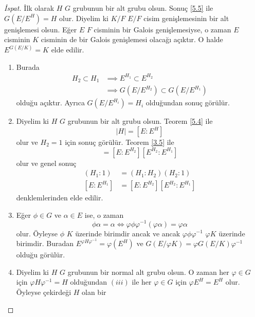 \documentclass{article}
\theoremstyle{definition}
\theoremstyle{remark}
\newcommand{\envert}[1]{\left\lvert#1\right\rvert}
\let\abs=\envert
\begin{document}
    	    \begin{proof}[İspat]
    	        İlk olarak $H$ $G$ grubunun bir alt grubu olsun. Sonuç \ref{5.5} ile $G(E/E^H) = H$ olur. Diyelim ki $K/F$ $E/F$ cisim genişlemesinin bir alt genişlemesi olsun. Eğer $E$ $F$ cisminin bir Galois genişlemesiyse, o zaman $E$ cisminin $K$ cisminin de bir Galois genişlemesi olacağı açıktır. O halde $E^{G(E/K)} = K$ elde edilir.
    	        \begin{enumerate}
    				\renewcommand{\labelenumi}{(\roman{enumi})}
    				\item Burada
    				\begin{align*}
    				    H_2 \subset H_1 &\implies E^{H_1} \subset E^{H_2}\\
    				    &\implies G(E/E^{H_2}) \subset G(E/E^{H_1})
    				\end{align*}
    				olduğu açıktır. Ayrıca $G(E/E^{H_i}) = H_i$ olduğundan sonuç görülür.
    				\item Diyelim ki $H$ $G$ grubunun bir alt grubu olsun. Teorem \ref{5.4} ile
    				\begin{equation*}
    				    \abs{H} = [E : E^H]
    				\end{equation*}
    			    olur ve $H_2 = 1$ için sonuç görülür. Teorem \ref{3.5} ile
    			    \begin{equation*}
    			        [E : E^{H_1}] = [E : E^{H_2}][E^{H_2} : E^{H_1}]
    			    \end{equation*}
    			    olur ve genel sonuç
    			    \begin{align*}
    			        (H_1 : 1) &= (H_1 : H_2)(H_2 : 1)\\
    			        [E : E^{H_1}] &= [E : E^{H_2}][E^{H_2} : E^{H_1}]
    			    \end{align*}
    			    denklemlerinden elde edilir.
    			    \item Eğer $\phi \in G$ ve $\alpha \in E$ ise, o zaman
    			    \begin{equation*}
    			        \phi \alpha = \alpha \iff \varphi \phi \varphi^{-1}(\varphi \alpha) = \varphi \alpha
    			    \end{equation*}
    			    olur. Öyleyse $\phi$ $K$ üzerinde birimdir ancak ve ancak $\varphi \phi \varphi^{-1}$ $\varphi K$ üzerinde birimdir. Buradan $E^{\varphi H \varphi^{-1}} = \varphi(E^H)$ ve $G(E/\varphi K) = \varphi G(E/K) \varphi^{-1}$ olduğu görülür.
    			    \item Diyelim ki $H$ $G$ grubunun bir normal alt grubu olsun. O zaman her $\varphi \in G$ için $\varphi H \varphi^{-1} = H$ olduğundan $(iii)$ ile her $\varphi \in G$ için $\varphi E^H = E^H$ olur. Öyleyse çekirdeği $H$ olan bir

\end{enumerate}
\end{proof}
\end{document}
